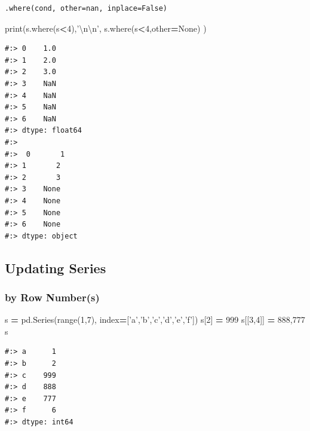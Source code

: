 \documentclass[
]{book}
\newenvironment{Shaded}{\begin{snugshade}}{\end{snugshade}}
\newcommand{\BuiltInTok}[1]{#1}
\newcommand{\CharTok}[1]{\textcolor[rgb]{0.5,0.5,0.5}{#1}}
\newcommand{\DecValTok}[1]{\textcolor[rgb]{0.06,0.06,0.06}{#1}}
\newcommand{\NormalTok}[1]{#1}
\newcommand{\OperatorTok}[1]{\textcolor[rgb]{0.43,0.43,0.43}{\textbf{#1}}}
\newcommand{\StringTok}[1]{\textcolor[rgb]{0.5,0.5,0.5}{#1}}
\newcommand{\VariableTok}[1]{\textcolor[rgb]{0,0,0}{#1}}
\begin{document}
\begin{verbatim}
.where(cond, other=nan, inplace=False)
\end{verbatim}

\begin{Shaded}
\begin{Highlighting}[]
\BuiltInTok{print}\NormalTok{(s.where(s}\OperatorTok{<}\DecValTok{4}\NormalTok{),}\StringTok{'}\CharTok{\textbackslash{}n\textbackslash{}n}\StringTok{'}\NormalTok{,}
\NormalTok{      s.where(s}\OperatorTok{<}\DecValTok{4}\NormalTok{,other}\OperatorTok{=}\VariableTok{None}\NormalTok{) )}
\end{Highlighting}
\end{Shaded}

\begin{verbatim}
#:> 0    1.0
#:> 1    2.0
#:> 2    3.0
#:> 3    NaN
#:> 4    NaN
#:> 5    NaN
#:> 6    NaN
#:> dtype: float64 
#:> 
#:>  0       1
#:> 1       2
#:> 2       3
#:> 3    None
#:> 4    None
#:> 5    None
#:> 6    None
#:> dtype: object
\end{verbatim}

\hypertarget{updating-series}{%
\subsection{Updating Series}\label{updating-series}}

\hypertarget{by-row-numbers-1}{%
\subsubsection{by Row Number(s)}\label{by-row-numbers-1}}

\begin{Shaded}
\begin{Highlighting}[]
\NormalTok{s }\OperatorTok{=}\NormalTok{ pd.Series(}\BuiltInTok{range}\NormalTok{(}\DecValTok{1}\NormalTok{,}\DecValTok{7}\NormalTok{), index}\OperatorTok{=}\NormalTok{[}\StringTok{'a'}\NormalTok{,}\StringTok{'b'}\NormalTok{,}\StringTok{'c'}\NormalTok{,}\StringTok{'d'}\NormalTok{,}\StringTok{'e'}\NormalTok{,}\StringTok{'f'}\NormalTok{])}
\NormalTok{s[}\DecValTok{2}\NormalTok{] }\OperatorTok{=} \DecValTok{999}
\NormalTok{s[[}\DecValTok{3}\NormalTok{,}\DecValTok{4}\NormalTok{]] }\OperatorTok{=} \DecValTok{888}\NormalTok{,}\DecValTok{777}
\NormalTok{s}
\end{Highlighting}
\end{Shaded}

\begin{verbatim}
#:> a      1
#:> b      2
#:> c    999
#:> d    888
#:> e    777
#:> f      6
#:> dtype: int64
\end{verbatim}
\end{document}
